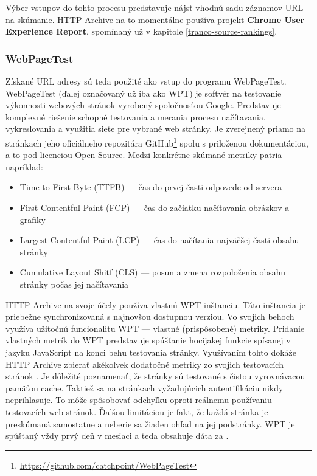 Výber vstupov do tohto procesu predstavuje nájsť vhodnú sadu záznamov URL na skúmanie. 
HTTP Archive na to momentálne používa projekt \textbf{Chrome User Experience Report}, spomínaný už v kapitole \ref{tranco-source-rankings}.

\subsubsection{WebPageTest}

Získané URL adresy sú teda použité ako vstup do programu WebPageTest. WebPageTest (ďalej označovaný už iba ako WPT) je softvér na testovanie výkonnosti webových stránok vyrobený spoločnosťou Google. Predstavuje komplexné riešenie schopné testovania a merania procesu načítavania, vykresľovania a využitia siete pre vybrané web stránky. 
Je zverejnený priamo na stránkach jeho oficiálneho repozitára GitHub\footnote{\href{https://github.com/catchpoint/WebPageTest}{https://github.com/catchpoint/WebPageTest}} spolu s priloženou dokumentáciou, a to pod licenciou Open Source.
Medzi konkrétne skúmané metriky patria napríklad: \cite{webpagetest}
\begin{itemize}
    \item Time to First Byte (TTFB) --- čas do prvej časti odpovede od servera
    \item First Contentful Paint (FCP) --- čas do začiatku načítavania obrázkov a grafiky
    \item Largest Contentful Paint (LCP) --- čas do načítania najväčšej časti obsahu stránky 
    \item Cumulative Layout Shitf (CLS) --- posun a zmena rozpoloženia obsahu stránky počas jej načítavania
\end{itemize}

HTTP Archive na svoje účely používa vlastnú WPT inštanciu. 
Táto inštancia je priebežne synchronizovaná s najnovšou dostupnou verziou.
Vo svojich behoch využíva užitočnú funcionalitu WPT --- vlastné (prispôsobené) metriky.
Pridanie vlastných metrík do WPT predstavuje spúšťanie hocijakej funkcie spísanej v jazyku JavaScript na konci behu testovania stránky. 
Využívaním tohto dokáže HTTP Archive zbierať akékoľvek dodatočné metriky zo svojich testovacích stránok \cite{webpagetest}.
Je dôležité poznamenať, že stránky sú testované s čistou vyrovnávacou pamäťou cache. Taktiež sa na stránkach vyžadujúcich autentifikáciu nikdy neprihlasuje.
To môže spôsobovať odchyľku oproti reálnemu používaniu testovacích web stránok. Ďalšou limitáciou je fakt, že každá stránka je preskúmaná samostatne a neberie sa žiaden ohľad na jej podstránky.
WPT je spúšťaný vždy prvý deň v mesiaci a teda obsahuje dáta za . 

